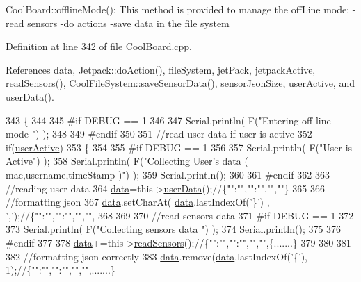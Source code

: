 Cool\+Board\+::offline\+Mode()\+: This method is provided to manage the off\+Line mode\+: -\/read sensors -\/do actions -\/save data in the file system 

Definition at line 342 of file Cool\+Board.\+cpp.



References data, Jetpack\+::do\+Action(), file\+System, jet\+Pack, jetpack\+Active, read\+Sensors(), Cool\+File\+System\+::save\+Sensor\+Data(), sensor\+Json\+Size, user\+Active, and user\+Data().


\begin{DoxyCode}
343 \{
344 
345 \textcolor{preprocessor}{#if DEBUG == 1  }
346     
347     Serial.println( F(\textcolor{stringliteral}{"Entering off line mode "}) ); 
348     
349 \textcolor{preprocessor}{#endif}
350 
351     \textcolor{comment}{//read user data if user is active}
352     \textcolor{keywordflow}{if}(\hyperlink{classCoolBoard_a6395459131d6889a3005f79c7a35e964}{userActive})
353     \{
354 
355 \textcolor{preprocessor}{    #if DEBUG == 1}
356         
357         Serial.println( F(\textcolor{stringliteral}{"User is Active"}) );
358         Serial.println( F(\textcolor{stringliteral}{"Collecting User's data ( mac,username,timeStamp )"}) );
359         Serial.println();
360 
361 \textcolor{preprocessor}{    #endif}
362 
363         \textcolor{comment}{//reading user data}
364         \hyperlink{classCoolBoard_a427fb753dd8575bdf821c70a5c63d695}{data}=this->\hyperlink{classCoolBoard_ae7358fb6e623cfc81b775f5f1734909b}{userData}();\textcolor{comment}{//\{"":"","":"","",""\}}
365 
366         \textcolor{comment}{//formatting json }
367         \hyperlink{classCoolBoard_a427fb753dd8575bdf821c70a5c63d695}{data}.setCharAt( \hyperlink{classCoolBoard_a427fb753dd8575bdf821c70a5c63d695}{data}.lastIndexOf(\textcolor{charliteral}{'\}'}) , \textcolor{charliteral}{','});\textcolor{comment}{//\{"":"","":"","","",}
368         
369                 
370         \textcolor{comment}{//read sensors data}
371 \textcolor{preprocessor}{    #if DEBUG == 1}
372 
373         Serial.println( F(\textcolor{stringliteral}{"Collecting sensors data "}) );
374         Serial.println();
375 
376 \textcolor{preprocessor}{    #endif}
377 
378         \hyperlink{classCoolBoard_a427fb753dd8575bdf821c70a5c63d695}{data}+=this->\hyperlink{classCoolBoard_ad03abdce2e65f520bbf2cff0f2d083cf}{readSensors}();\textcolor{comment}{//\{"":"","":"","","",\{.......\}}
379 
380         
381 
382         \textcolor{comment}{//formatting json correctly}
383         \hyperlink{classCoolBoard_a427fb753dd8575bdf821c70a5c63d695}{data}.remove(\hyperlink{classCoolBoard_a427fb753dd8575bdf821c70a5c63d695}{data}.lastIndexOf(\textcolor{charliteral}{'\{'}), 1);\textcolor{comment}{//\{"":"","":"","","",.......\}}

\end{DoxyCode}
